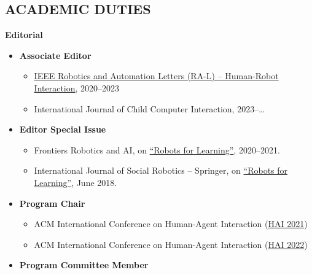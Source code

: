 
\subsection{ACADEMIC DUTIES}

\vspace{2pt}
\textbf{Editorial}
\begin{itemize}
    \item[$\diamond$] \textbf{Associate Editor}
    \begin{itemize}
        \item \href{https://www.ieee-ras.org/publications/ra-l/ra-letters-editorial-board#AssocEd}{IEEE Robotics and Automation Letters (RA-L) -- Human-Robot Interaction}, 2020--2023
        \item International Journal of Child Computer Interaction, 2023--\ldots
    \end{itemize}
    \item[$\diamond$] \textbf{Editor Special Issue}
    \begin{itemize}
        \item Frontiers Robotics and AI, on \href{https://www.frontiersin.org/research-topics/14092/robots-for-learning}{``Robots for Learning''}, 2020--2021.
        \item International Journal of Social Robotics -- Springer, on \href{https://link.springer.com/journal/12369/10/3/page/1}{``Robots for Learning''}, June 2018.
    \end{itemize}
    \item[$\diamond$] \textbf{Program Chair}
    \begin{itemize}
        \item {} ACM International Conference on Human-Agent Interaction (\href{http://hai-conference.net/hai2021/}{HAI 2021})
        \item {} ACM International Conference on Human-Agent Interaction (\href{http://hai-conference.net/hai2022/}{HAI 2022})
    \end{itemize}
    \item[$\diamond$] \textbf{Program Committee Member}
    \begin{itemize}

\end{itemize}
\end{itemize}
